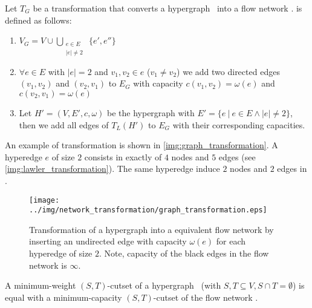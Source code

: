 \begin{definition}
Let $T_G$ be a transformation that converts a hypergraph \HypergraphDef~into 
a flow network .  is defined as follows:
\begin{enumerate}
\item $V_G = V \cup \bigcup\limits_{\substack{e \in E \\ |e| \neq 2}}\ \{e', e''\}$
\item $\forall e \in E$ with $|e| = 2$ and $v_1,v_2 \in e$ ($v_1 \neq v_2$) we add 
      two directed edges $(v_1,v_2)$ and $(v_2,v_1)$ to $E_G$ with capacity $c(v_1,v_2) = \omega(e)$
      and $c(v_2,v_1) = \omega(e)$
\item Let $H' = (V,E',c,\omega)$ be the hypergraph with $E' = \{e\ |\ e \in E \land |e| \neq 2\}$,
      then we add all edges of $T_L(H')$ to $E_G$ with their corresponding capacities.
\end{enumerate} 
\end{definition}

An example of transformation  is shown in \autoref{img:graph_transformation}. A hyperedge
$e$ of size $2$ consists in  exactly of $4$ nodes and $5$ edges (see \autoref{img:lawler_transformation}).
The same hyperedge induce $2$ nodes and $2$ edges in . 
 
\begin{figure}
\centering
\texttt{[image: ../img/network\_transformation/graph\_transformation.eps]}
\caption{Transformation of a hypergraph into a equivalent flow network by inserting 
         an undirected edge with capacity $\omega(e)$ for each hyperedge of size $2$. 
         Note, capacity of the black edges in the flow network is $\infty$.}
\label{img:graph_transformation}
\end{figure}

\begin{theorem}
\label{theorem:st_cutset_equal_graph}
A minimum-weight $(S,T)$-cutset of a hypergraph \HypergraphDef~(with $S,T \subseteq V,
S \cap T = \emptyset$) is equal with a minimum-capacity $(S,T)$-cutset of the
flow network .
\label{theorem:heuer_network}
\end{theorem}

